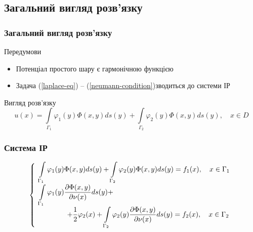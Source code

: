 \documentclass{beamer}
\numberwithin{equation}{section}
\newcommand{\intl}{\int\limits}
\newcommand{\boundprob}{(\ref{laplace-eq}) -- (\ref{neumann-condition})}
\begin{document}

	\subsection{Загальний вигляд розв'язку}
	\begin{frame}
		\frametitle{Загальний вигляд розв'язку}
		
		\begin{block}{Передумови}
			\begin{itemize}
				\item Потенціал простого шару є гармонічною функцією
				\item Задача \boundprob зводиться до системи ІР
			\end{itemize}
		\end{block}
		\vspace{0.8cm}
		\begin{block}{Вигляд розв'язку}
			$$
			u(x) 
			= \intl_{\Gamma_1} \varphi_1(y) \Phi(x, y) d s(y)
			+ \intl_{\Gamma_2} \varphi_2(y) \Phi(x, y) d s(y)
			, \quad x \in D
			$$
		\end{block}
	\end{frame}

	\begin{frame}
		\frametitle{Система ІР}
		
		\begin{block}{}
			$$
			\left\{
			\begin{array}{l}
				\displaystyle
				\intl_{\Gamma_{1}} \varphi_1(y) \Phi(x, y) d s(y)
				+ \intl_{\Gamma_{2}} \varphi_2(y) \Phi(x, y) d s(y)
				= f_{1}(x), \quad x \in \Gamma_{1} 
				\\ [0.5cm]
				\displaystyle
				\intl_{\Gamma_{1}} \varphi_1(y) \frac{\partial \Phi(x, y)}{\partial \nu(x)} d s(y) \space +
				\\
				\displaystyle
				\qquad\qquad + \space \frac{1}{2}\varphi_2(x)
				+ \intl_{\Gamma_{2}} \varphi_2(y) \frac{\partial \Phi(x, y)}{\partial \nu(x)} d s(y)
				= f_{2}(x), \quad x \in \Gamma_{2}
			\end{array}\right.
			$$
		\end{block}
	\end{frame}

\end{document}
